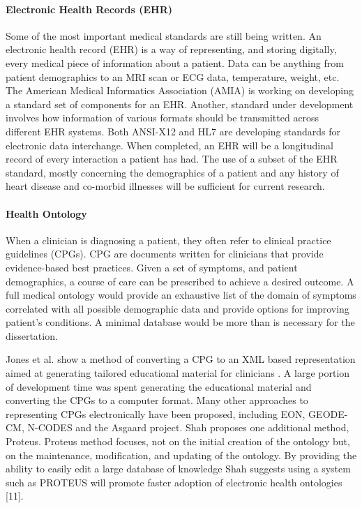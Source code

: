 \paragraph{Electronic Health Records (EHR)}
\label{par:ElectronicHealthRecords}
Some of the most important medical standards are still being written. An electronic health record (EHR) is a way of representing, and storing digitally, every medical piece of information about a patient. Data can be anything from patient demographics to an MRI scan or ECG data, temperature, weight, etc. The American Medical Informatics Association (AMIA) is working on developing a standard set of components for an EHR. Another, standard under development involves how information of various formats should be transmitted across different EHR systems. Both ANSI-X12 and HL7 are developing standards for electronic data interchange. When completed, an EHR will be a longitudinal record of every interaction a patient has had. The use of a subset of the EHR standard, mostly concerning the demographics of a patient and any history of heart disease and co-morbid illnesses will be sufficient for current research.

\paragraph{Health Ontology}
\label{par:HealthOntology}
When a clinician is diagnosing a patient, they often refer to clinical practice guidelines (CPGs). CPG are documents written for clinicians that provide evidence-based best practices. Given a set of symptoms, and patient demographics, a course of care can be prescribed to achieve a desired outcome. A full medical ontology would provide an exhaustive list of the domain of symptoms correlated with all possible demographic data and provide options for improving patient's conditions. A minimal database would be more than is necessary for the dissertation.

Jones et al. show a method of converting a CPG to an XML based representation aimed at generating tailored educational material for clinicians \cite{Jones2005}. A large portion of development time was spent generating the educational material and converting the CPGs to a computer format.  Many other approaches to representing CPGs electronically have been proposed, including EON, GEODE-CM, N-CODES\cite{Peleg2003} and the Asgaard project\cite{Shahar1998}. Shah proposes one additional method, Proteus\cite{Shah2001}. Proteus method focuses, not on the initial creation of the ontology but, on the maintenance, modification, and updating of the ontology.  By providing the ability to easily edit a large database of knowledge Shah suggests using a system such as PROTEUS will promote faster adoption of electronic health ontologies [11].

